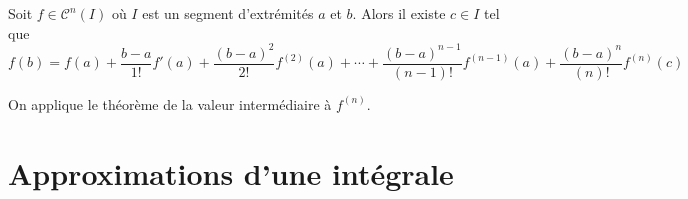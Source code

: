 \begin{prop}
 Soit $f\in \mathcal C^{n}(I)$ où $I$ est un segment d'extrémités $a$ et $b$. Alors il existe $c\in I$ tel que
\begin{displaymath}
 f(b)= f(a)+\frac{b-a}{1!}f'(a)+\frac{(b-a)^2}{2!}f^{(2)}(a) + \cdots +
\frac{(b-a)^{n-1}}{(n-1)!}f^{(n-1)}(a) +
\frac{(b-a)^{n}}{(n)!}f^{(n)}(c)
\end{displaymath}
\end{prop}
\begin{demo}
 On applique le théorème de la valeur intermédiaire à $f^{(n)}$.
\end{demo}

\section{Approximations d'une intégrale}
